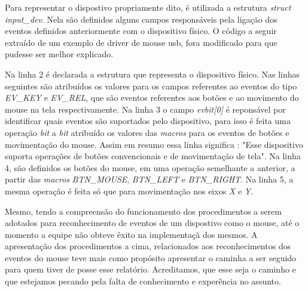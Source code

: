 Para representar o dispostivo propriamente dito, é utilizada a estrutura \textit{struct input\_dev}. Nela são definidos alguns campos responsáveis pela ligação dos eventos definidos anteriormente com o dispositivo físico. O código a seguir extraído de um exemplo de driver de mouse usb, fora modificado para que pudesse ser melhor explicado.
\lstset{style=shell}


Na linha 2 é declarada a estrutura que representa o dispositivo físico. Nas linhas seguintes são atribuídos os valores para os campos referentes ao eventos do tipo \textit{EV\_KEY} e \textit{EV\_REL}, que são eventos referentes aos botões e ao movimento do mouse na tela respectivamente. Na linha 3 o campo \textit{evbit[0]} é reponsável por identificar quais eventos são suportados pelo dispositivo, para isso é feita uma operação \textit{bit} a \textit{bit} atribuído os valores das \textit{macros} para os eventos de botões e movimentação do mouse. Assim em resumo essa linha significa : "Esse dispositivo suporta operações de botões convencionais e de movimentação de tela". Na linha 4, são definidos os botões do mouse, em uma operação semelhante a anterior, a partir das \textit{macros} \textit{BTN\_MOUSE}, \textit{BTN\_LEFT} e \textit{BTN\_RIGHT}. Na linha 5, a mesma operação é feita só que para movimentação nos eixos \textit{X} e \textit{Y}. 

Mesmo, tendo a compreensão do funcionamento dos procedimentos a serem adotados para reconhecimento de eventos de um dispostivo como o mouse, até o momento a equipe não obteve êxito na implementaçã dos mesmos. A apresentação dos procedimentos a cima, relacionados aos reconhecimentos dos eventos do mouse teve mais como propósito apresentar o caminha a ser seguido para quem tiver de posse esse relatório. Acreditamos, que esse seja o caminho e que estejamos pecando pela falta de conhecimento e experência no assunto.